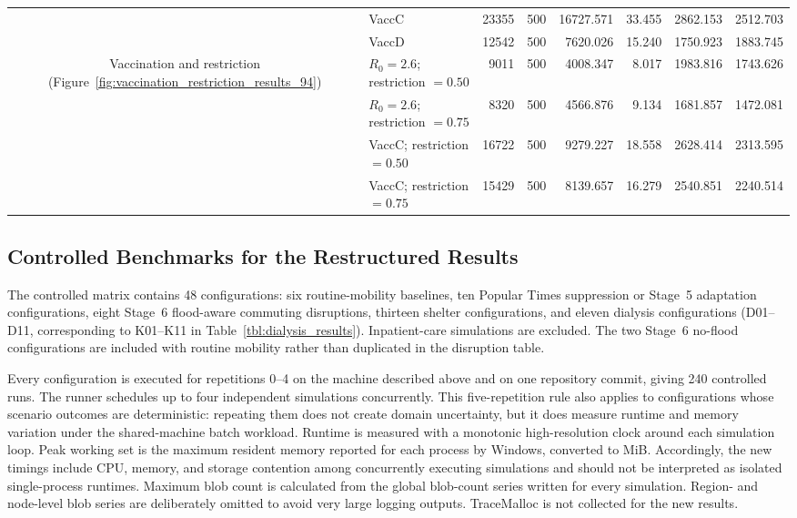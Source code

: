 \begin{table}[htbp]
{\begin{tabular}{@{}clrrrrrr@{}}
  & VaccC & 23355 & 500 & 16727.571 & 33.455 & 2862.153 & 2512.703 \\
  & VaccD & 12542 & 500 & 7620.026 & 15.240 & 1750.923 & 1883.745 \\
\midrule
\multirow{4}{*}{Vaccination and restriction (Figure~\ref{fig:vaccination_restriction_results_94})}
  & $R_0=2.6$; restriction $=0.50$ & 9011 & 500 & 4008.347 & 8.017 & 1983.816 & 1743.626 \\
  & $R_0=2.6$; restriction $=0.75$ & 8320 & 500 & 4566.876 & 9.134 & 1681.857 & 1472.081 \\
  & VaccC; restriction $=0.50$ & 16722 & 500 & 9279.227 & 18.558 & 2628.414 & 2313.595 \\
  & VaccC; restriction $=0.75$ & 15429 & 500 & 8139.657 & 16.279 & 2540.851 & 2240.514 \\
\bottomrule
\end{tabular}%
}
\end{table}

\subsection{Controlled Benchmarks for the Restructured Results}

The controlled matrix contains 48 configurations: six routine-mobility
baselines, ten Popular Times suppression or Stage~5 adaptation configurations,
eight Stage~6 flood-aware commuting disruptions, thirteen shelter
configurations, and eleven dialysis configurations (D01--D11, corresponding to
K01--K11 in Table~\ref{tbl:dialysis_results}).  Inpatient-care simulations are
excluded.  The two Stage~6 no-flood configurations are included with routine
mobility rather than duplicated in the disruption table.

Every configuration is executed for repetitions 0--4 on the machine described
above and on one repository commit, giving 240 controlled runs.  The runner
schedules up to four independent simulations concurrently.  This five-repetition
rule also applies to configurations whose scenario outcomes are deterministic:
repeating them does not create domain uncertainty, but it does measure runtime
and memory variation under the shared-machine batch workload.  Runtime is
measured with a monotonic high-resolution clock around each simulation loop.
Peak working set is the maximum resident memory reported for each process by
Windows, converted to MiB.  Accordingly, the new timings include CPU, memory,
and storage contention among concurrently executing simulations and should not
be interpreted as isolated single-process runtimes.
Maximum blob count is calculated from the global blob-count series written for
every simulation.  Region- and node-level blob series are deliberately omitted
to avoid very large logging outputs.  TraceMalloc is not collected for the new
results.

